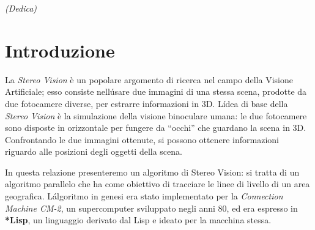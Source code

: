 \documentclass[12pt,a4paper,openright,twoside]{report}
\begin{document}
\clearpage{\pagestyle{empty}\cleardoublepage}

\newpage

\begin{titlepage}
\thispagestyle{empty}
\topmargin=6.5cm
\raggedleft
\large
\em
(Dedica)
\clearpage{\pagestyle{empty}\cleardoublepage}
\end{titlepage}



\tableofcontents
\rhead[\fancyplain{}{\bfseries\leftmark}]{\fancyplain{}{\bfseries\thepage}}
\clearpage{\pagestyle{empty}\cleardoublepage}

\listoffigures
\clearpage{\pagestyle{empty}\cleardoublepage}





\chapter*{Introduzione}



La \textit{Stereo Vision} è un popolare argomento di ricerca nel campo della Visione Artificiale; esso consiste nell\'usare due immagini di una stessa scena, prodotte da due fotocamere diverse, per estrarre informazioni in 3D. L\'idea di base della \textit{Stereo Vision} è la simulazione della visione binoculare umana: le due fotocamere sono disposte in orizzontale per fungere da ``occhi'' che guardano la scena in 3D. Confrontando le due immagini ottenute, si possono ottenere informazioni riguardo alle posizioni degli oggetti della scena.

In questa relazione presenteremo un algoritmo di Stereo Vision: si tratta di un algoritmo parallelo che ha come obiettivo di tracciare le linee di livello di un area geografica. L\'algoritmo in genesi era stato implementato per la \textit{Connection Machine CM-2}, un supercomputer sviluppato negli anni 80, ed era espresso in \textbf{*Lisp}, un linguaggio derivato dal Lisp e ideato per la macchina stessa.
\end{document}
